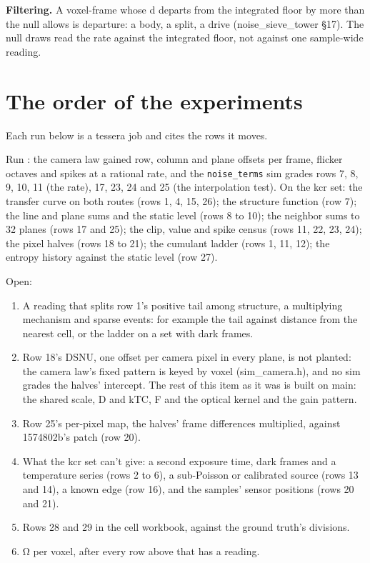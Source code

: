 \textbf{Filtering.} A voxel-frame whose d departs from the integrated floor by more than the null allows is departure: a body, a split, a drive (noise\_\allowbreak{}sieve\_\allowbreak{}tower §17). The null draws read the rate against the integrated floor, not against one sample-wide reading.

\section{\texorpdfstring{The order of the experiments}{The order of the experiments}}

Each run below is a tessera job and cites the rows it moves.

Run : the camera law gained row, column and plane offsets per frame, flicker octaves and spikes at a rational rate, and the \texttt{noise\_\allowbreak{}terms} sim grades rows 7, 8, 9, 10, 11 (the rate), 17, 23, 24 and 25 (the interpolation test). On the kcr set: the transfer curve on both routes (rows 1, 4, 15, 26); the structure function (row 7); the line and plane sums and the static level (rows 8 to 10); the neighbor sums to 32 planes (rows 17 and 25); the clip, value and spike census (rows 11, 22, 23, 24); the pixel halves (rows 18 to 21); the cumulant ladder (rows 1, 11, 12); the entropy history against the static level (row 27).

Open:

\begin{enumerate}
\item A reading that splits row 1's positive tail among structure, a multiplying mechanism and sparse events: for example the tail against distance from the nearest cell, or the ladder on a set with dark frames.
\item Row 18's DSNU, one offset per camera pixel in every plane, is not planted: the camera law's fixed pattern is keyed by voxel (sim\_\allowbreak{}camera.h), and no sim grades the halves' intercept. The rest of this item as it was is built on main: the shared scale, D and kTC, F and the optical kernel and the gain pattern.
\item Row 25's per-pixel map, the halves' frame differences multiplied, against 1574802b's patch (row 20).
\item What the kcr set can't give: a second exposure time, dark frames and a temperature series (rows 2 to 6), a sub-Poisson or calibrated source (rows 13 and 14), a known edge (row 16), and the samples' sensor positions (rows 20 and 21).
\item Rows 28 and 29 in the cell workbook, against the ground truth's divisions.
\item Ω per voxel, after every row above that has a reading.
\end{enumerate}
